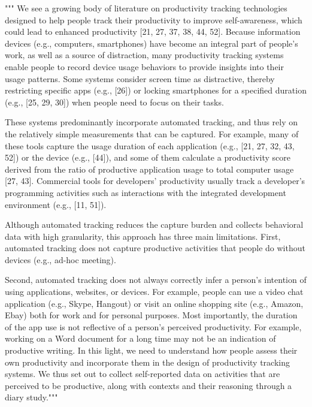 
"""
We see a growing body of literature on productivity tracking technologies designed to help people
track their productivity to improve self-awareness,
which could lead to enhanced productivity [21, 27, 37, 38, 44, 52].
Because information devices (e.g., computers, smartphones)
have become an integral part of people's work, as well as a source of distraction,
many productivity tracking systems enable people to record device usage behaviors to provide insights
into their usage patterns. Some systems consider screen time as distractive, thereby restricting specific apps
(e.g., [26]) or locking smartphones for a specified duration
(e.g., [25, 29, 30]) when people need to focus on their tasks.

These systems predominantly incorporate automated tracking, and thus rely on the relatively simple measurements that can be captured. For example, many of these tools capture the usage duration of each application (e.g., [21, 27, 32, 43, 52]) or the device (e.g., [44]), and some of them calculate a productivity score derived from the ratio of productive application usage to total computer usage  [27, 43]. Commercial tools for developers’ productivity usually track a developer's programming activities such as interactions with the integrated development environment (e.g., [11, 51]).

Although automated tracking reduces the capture burden and collects behavioral data with high granularity,
this approach has three main limitations.
First, automated tracking does not capture productive activities that people do without devices (e.g., ad-hoc meeting).

Second, automated tracking does not always correctly infer a person's intention of using applications, websites, or devices.
For example, people can use a video chat application (e.g., Skype, Hangout) or visit an online shopping site (e.g., Amazon, Ebay)
both for work and for personal purposes. Most importantly, the duration of the app use is not reflective of a person's perceived productivity. For example, working on a Word document for a long time may not be an indication of productive writing. In this light, we need to understand how people assess their own productivity and incorporate them in the design of productivity tracking systems. We thus set out to collect self-reported data on activities that are perceived to be productive, along with contexts and their reasoning through a diary study."""
\cite{Kim2019May}




